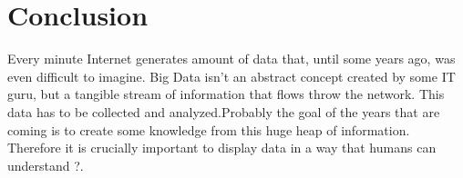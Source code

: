 \documentclass[a4paper,13pt]{report}
\begin{document}
\section{Conclusion}
Every minute Internet generates amount of data that, until some years ago, was even difficult to imagine. Big Data isn't an abstract concept created by some IT guru, but a tangible stream of information that flows throw the network. This data has to be collected and analyzed.Probably the goal of the years that are coming is to create some knowledge from this huge heap of information. Therefore it is crucially important to display data in a way that humans can understand ?.
\cleardoublepage
{}

\end{document}
